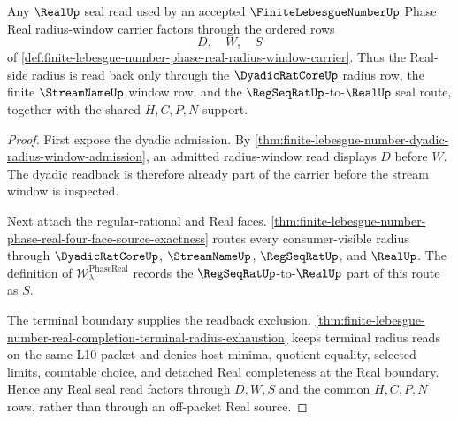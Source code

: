 \begin{theorem}
\label{thm:finite-lebesgue-number-real-seal-radius-readback}
Any $\RealUp$ seal read used by an accepted $\FiniteLebesgueNumberUp$ Phase Real radius-window carrier factors through the ordered rows
$$
D,\quad W,\quad S
$$
of \autoref{def:finite-lebesgue-number-phase-real-radius-window-carrier}. Thus the Real-side radius is read back only through the $\DyadicRatCoreUp$ radius row, the finite $\StreamNameUp$ window row, and the $\RegSeqRatUp$-to-$\RealUp$ seal route, together with the shared $H,C,P,N$ support.
\end{theorem}
\begin{proof}
First expose the dyadic admission. By \autoref{thm:finite-lebesgue-number-dyadic-radius-window-admission}, an admitted radius-window read displays $D$ before $W$. The dyadic readback is therefore already part of the carrier before the stream window is inspected.

Next attach the regular-rational and Real faces. \autoref{thm:finite-lebesgue-number-phase-real-four-face-source-exactness} routes every consumer-visible radius through $\DyadicRatCoreUp$, $\StreamNameUp$, $\RegSeqRatUp$, and $\RealUp$. The definition of $\mathcal{W}_{\lambda}^{\mathrm{PhaseReal}}$ records the $\RegSeqRatUp$-to-$\RealUp$ part of this route as $S$.

The terminal boundary supplies the readback exclusion. \autoref{thm:finite-lebesgue-number-real-completion-terminal-radius-exhaustion} keeps terminal radius reads on the same L10 packet and denies host minima, quotient equality, selected limits, countable choice, and detached Real completeness at the Real boundary. Hence any Real seal read factors through $D,W,S$ and the common $H,C,P,N$ rows, rather than through an off-packet Real source.
\end{proof}

